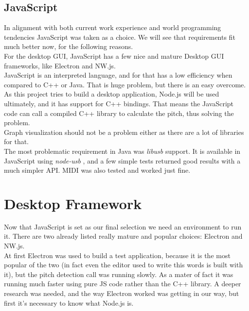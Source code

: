 \subsection{JavaScript}
In alignment with both current work experience and world programming tendencies
JavaScript was taken as a choice. We will see that requirements fit much better now,
for the following reasons. \\
For the desktop GUI, JavaScript has a few nice and mature Desktop GUI frameworks,
like Electron and NW.js. \\
JavaScript is an interpreted language, and for that has a low efficiency when
compared to C++ or Java. That is huge problem, but there is an easy overcome. As
this project tries to build a desktop application, Node.js will be used ultimately,
and it has support for C++ bindings. That means the JavaScript code can call a
compiled C++ library to calculate the pitch, thus solving the problem. \\
Graph visualization should not be a problem either as there are a lot of libraries
for that. \\
The most problematic requirement in Java was \textit{libusb} support. It is available
in JavaScript using \textit{node-usb} \cite{node-usb}, and a few simple tests
returned good results with a much simpler API. MIDI was also tested and worked just fine.

\section{Desktop Framework}
Now that JavaScript is set as our final selection we need an environment to run
it. There are two already listed really mature and popular choices: Electron and NW.js. \\
At first Electron was used to build a test application, because it is the most popular
of the two (in fact even the editor used to write this words is built with it),
but the pitch detection call was running slowly. As a mater of fact it was running
much faster using pure JS code rather than the C++ library. A deeper research
was needed, and the way Electron worked was getting in our way, but first it's
necessary to know what Node.js is.

